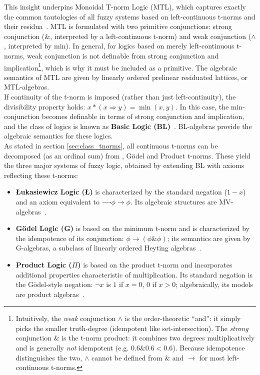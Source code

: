 This insight underpins Monoidal T-norm Logic (MTL), which captures exactly the common tautologies of all fuzzy systems based on left-continuous t-norms and their residua~\cite{GodoMonoidal}. MTL is formulated with two primitive conjunctions: strong conjunction ($\&$, interpreted by a left-continuous t-norm) and weak conjunction ($\wedge$, interpreted by min). In general, for logics based on merely left-continuous t-norms, weak conjunction is not definable from strong conjunction and implication\footnote{Intuitively, the \emph{weak} conjunction $\wedge$ is the order-theoretic ``and'': it simply picks the smaller truth-degree (idempotent like set-intersection). The \emph{strong} conjunction $\&$ is the t-norm product: it combines two degrees multiplicatively and is generally \emph{not} idempotent (e.g. $0.6\&0.6<0.6$). Because idempotence distinguishes the two, $\wedge$ cannot be defined from $\&$ and $\to$ for most left-continuous t-norms.}, which is why it must be included as a primitive. The algebraic semantics of MTL are given by linearly ordered prelinear residuated lattices, or MTL-algebras.\\

If continuity of the t-norm is imposed (rather than just left-continuity), the divisibility property holds: $x * (x \Rightarrow y) = \min(x, y)$. In this case, the min-conjunction becomes definable in terms of strong conjunction and implication, and the class of logics is known as \textbf{Basic Logic (BL)}~\cite[Sec. 2.2]{Hajek1998}. BL-algebras provide the algebraic semantics for these logics.\\ 

As stated in section \ref{sec:class_tnorms}, all continuous t-norms can be decomposed (as an ordinal sum) from \luka, Gödel and Product t-norms. These yield the three major systems of fuzzy logic, obtained by extending BL with axioms reflecting these t-norms:
\begin{itemize}
    \item \textbf{Łukasiewicz Logic (\L)} is characterized by the standard negation ($1-x$) and an axiom equivalent to $\lnot\lnot\phi \rightarrow \phi$. Its algebraic structures are MV-algebras~\cite[Ch. 3]{Hajek1998}.
    \item \textbf{Gödel Logic (G)} is based on the minimum t-norm and is characterized by the idempotence of its conjunction: $\phi \rightarrow (\phi \& \phi)$; its semantics are given by G-algebras, a subclass of linearly ordered Heyting algebras~\cite[Sec. 4.2]{Hajek1998}.
    \item \textbf{Product Logic ($\Pi$)} is based on the product t-norm and incorporates additional properties characteristic of multiplication. Its standard negation is the Gödel-style negation: $\lnot x$ is $1$ if $x=0$, $0$ if $x>0$; algebraically, its models are product algebras~\cite[Sec. 4.1]{Hajek1998}.
\end{itemize}

